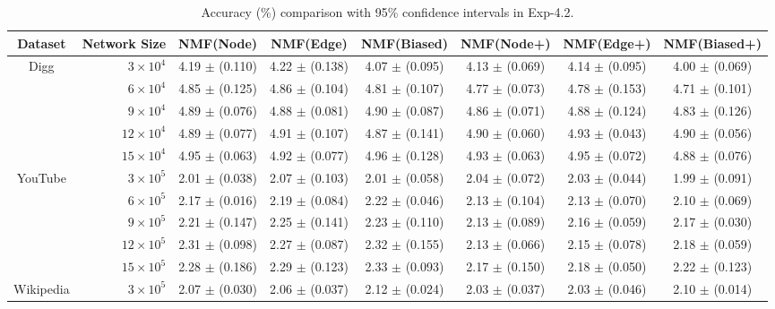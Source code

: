 \documentclass[10pt,journal,compsoc]{IEEEtran}
\newcommand{\Node}{{\sf NMF(Node)}\xspace}
\newcommand{\Edge}{{\sf NMF(Edge)}\xspace}
\newcommand{\Biased}{{\sf NMF(Biased)}\xspace}
\newcommand{\Digg}{{\sf Digg}\xspace}
\newcommand{\YouTube}{{\sf YouTube}\xspace}
\newcommand{\Wikipedia}{{\sf Wikipedia}\xspace}
\newcommand{\Nodep}{{\sf NMF(Node+)}\xspace}
\newcommand{\Edgep}{{\sf NMF(Edge+)}\xspace}
\newcommand{\Biasedp}{{\sf NMF(Biased+)}\xspace}
\begin{document}
\begin{table}
\caption{Accuracy (\%) comparison with 95\% confidence intervals in Exp-4.2.}
\label{tab_accuracy_6}
\vspace{-2ex}
\centering
\newcommand{\tabincell}[2]{\begin{tabular}{@{}#1@{}}#2\end{tabular}}
\begin{tabular}{c|r|c|c|c|c|c|c}
\hline \hline Dataset  & Network Size &  \Node & \Edge & \Biased & \Nodep & \Edgep & \Biasedp   \\
\hline
\multirow{5}{*}{\Digg}
 & $3 \times 10^4 $ & 4.19 $\pm$ (0.110) & 4.22 $\pm$ (0.138) & 4.07 $\pm$ (0.095) & 4.13 $\pm$ (0.069) & 4.14 $\pm$ (0.095) & 4.00 $\pm$ (0.069) \\
 & $6 \times 10^4 $ & 4.85 $\pm$ (0.125) & 4.86 $\pm$ (0.104) & 4.81 $\pm$ (0.107) & 4.77 $\pm$ (0.073) & 4.78 $\pm$ (0.153) & 4.71 $\pm$ (0.101)  \\
 & $9 \times 10^4 $ & 4.89 $\pm$ (0.076) & 4.88 $\pm$ (0.081) & 4.90 $\pm$ (0.087) & 4.86 $\pm$ (0.071) & 4.88 $\pm$ (0.124) & 4.83 $\pm$ (0.126)  \\
 & $12 \times 10^4 $ & 4.89 $\pm$ (0.077) & 4.91 $\pm$ (0.107) & 4.87 $\pm$ (0.141) & 4.90 $\pm$ (0.060) & 4.93 $\pm$ (0.043) & 4.90 $\pm$ (0.056) \\
 & $15 \times 10^4 $ & 4.95 $\pm$ (0.063) & 4.92 $\pm$ (0.077) & 4.96 $\pm$ (0.128) & 4.93 $\pm$ (0.063) & 4.95 $\pm$ (0.072) & 4.88 $\pm$ (0.076)  \\
\hline
\multirow{5}{*}{\YouTube}
 & $3 \times 10^5 $ & 2.01 $\pm$ (0.038) & 2.07 $\pm$ (0.103) & 2.01 $\pm$ (0.058) & 2.04 $\pm$ (0.072) & 2.03 $\pm$ (0.044) & 1.99 $\pm$ (0.091)  \\
 & $6 \times 10^5 $ & 2.17 $\pm$ (0.016) & 2.19 $\pm$ (0.084) & 2.22 $\pm$ (0.046) & 2.13 $\pm$ (0.104) & 2.13 $\pm$ (0.070) & 2.10 $\pm$ (0.069)  \\
 & $9 \times 10^5 $ & 2.21 $\pm$ (0.147) & 2.25 $\pm$ (0.141) & 2.23 $\pm$ (0.110) & 2.13 $\pm$ (0.089) & 2.16 $\pm$ (0.059) & 2.17 $\pm$ (0.030)  \\
 & $12 \times 10^5 $ & 2.31 $\pm$ (0.098) & 2.27 $\pm$ (0.087) & 2.32 $\pm$ (0.155) & 2.13 $\pm$ (0.066) & 2.15 $\pm$ (0.078) & 2.18 $\pm$ (0.059)  \\
 & $15 \times 10^5 $ & 2.28 $\pm$ (0.186) & 2.29 $\pm$ (0.123) & 2.33 $\pm$ (0.093) & 2.17 $\pm$ (0.150) & 2.18 $\pm$ (0.050) & 2.22 $\pm$ (0.123)  \\
\hline
\multirow{5}{*}{\Wikipedia}
 & $3 \times 10^5 $ & 2.07 $\pm$ (0.030) & 2.06 $\pm$ (0.037) & 2.12 $\pm$ (0.024) & 2.03 $\pm$ (0.037) & 2.03 $\pm$ (0.046) & 2.10 $\pm$ (0.014)  \\

\end{tabular}
\end{table}
\end{document}
